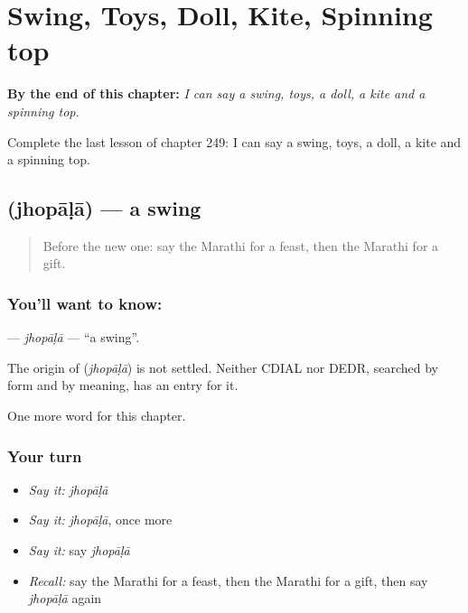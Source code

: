 
\chapter{Swing, Toys, Doll, Kite, Spinning top}
\label{ch:mr-swing-toys-doll-kite-spinning-top}

\begin{chapteropening}
\textbf{By the end of this chapter:} \emph{I can say a swing, toys, a doll, a kite and a spinning top.}

Complete the last lesson of chapter 249: I can say a swing, toys, a doll, a kite and a spinning top.
\end{chapteropening}

\section[\texorpdfstring{\mr{झोपाळा} (jhopāḷā)}{झोपाळा (jhopāḷā)}]{ (jhopāḷā) — a swing}

\label{lesson:MR-C249-jhopala}



\begin{quote}
Before the new one: say the Marathi for a feast, then the Marathi for a gift.
\end{quote}

\subsection*{You'll want to know: }
\textbf{} — \emph{jhopāḷā} — \textquotedblleft{}a swing\textquotedblright{}.

\begin{cousinweb}
The origin of \textbf{} (\emph{jhopāḷā}) is not settled. Neither CDIAL nor DEDR, searched by form and by meaning, has an entry for it.
\end{cousinweb}

\begin{grammarlens}[title={What you've built}]
One more word for this chapter.
\end{grammarlens}

\subsection*{Your turn}
\begin{itemize}
\raggedright
  \item \emph{Say it:} \emph{jhopāḷā}
  \item \emph{Say it:} \emph{jhopāḷā}, once more
  \item \emph{Say it:} say \emph{jhopāḷā}
  \item \emph{Recall:} say the Marathi for a feast, then the Marathi for a gift, then say \emph{jhopāḷā} again
\end{itemize}

